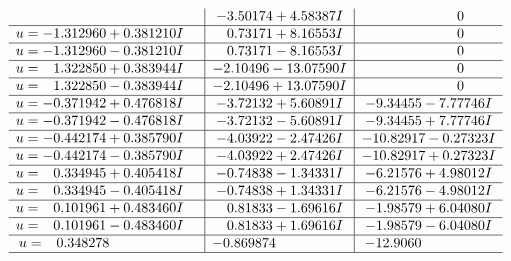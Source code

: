 \documentclass[1p]{elsarticle_modified}
\theoremstyle{definition}
\begin{document}
$$\begin{array}{c|c|c}
 & -3.50174 + 4.58387 I & \phantom{-0.000000 } 0 \\ \hline\begin{aligned}
u &= -1.312960 + 0.381210 I\end{aligned}
 & \phantom{-}0.73171 + 8.16553 I & \phantom{-0.000000 } 0 \\ \hline\begin{aligned}
u &= -1.312960 - 0.381210 I\end{aligned}
 & \phantom{-}0.73171 - 8.16553 I & \phantom{-0.000000 } 0 \\ \hline\begin{aligned}
u &= \phantom{-}1.322850 + 0.383944 I\end{aligned}
 & -2.10496 - 13.07590 I & \phantom{-0.000000 } 0 \\ \hline\begin{aligned}
u &= \phantom{-}1.322850 - 0.383944 I\end{aligned}
 & -2.10496 + 13.07590 I & \phantom{-0.000000 } 0 \\ \hline\begin{aligned}
u &= -0.371942 + 0.476818 I\end{aligned}
 & -3.72132 + 5.60891 I & -9.34455 - 7.77746 I \\ \hline\begin{aligned}
u &= -0.371942 - 0.476818 I\end{aligned}
 & -3.72132 - 5.60891 I & -9.34455 + 7.77746 I \\ \hline\begin{aligned}
u &= -0.442174 + 0.385790 I\end{aligned}
 & -4.03922 - 2.47426 I & -10.82917 - 0.27323 I \\ \hline\begin{aligned}
u &= -0.442174 - 0.385790 I\end{aligned}
 & -4.03922 + 2.47426 I & -10.82917 + 0.27323 I \\ \hline\begin{aligned}
u &= \phantom{-}0.334945 + 0.405418 I\end{aligned}
 & -0.74838 - 1.34331 I & -6.21576 + 4.98012 I \\ \hline\begin{aligned}
u &= \phantom{-}0.334945 - 0.405418 I\end{aligned}
 & -0.74838 + 1.34331 I & -6.21576 - 4.98012 I \\ \hline\begin{aligned}
u &= \phantom{-}0.101961 + 0.483460 I\end{aligned}
 & \phantom{-}0.81833 - 1.69616 I & -1.98579 + 6.04080 I \\ \hline\begin{aligned}
u &= \phantom{-}0.101961 - 0.483460 I\end{aligned}
 & \phantom{-}0.81833 + 1.69616 I & -1.98579 - 6.04080 I \\ \hline\begin{aligned}
u &= \phantom{-}0.348278\phantom{ +0.000000I}\end{aligned}
 & -0.869874\phantom{ +0.000000I} & -12.9060\phantom{ +0.000000I}\\
 \hline 
 \end{array}$$\newpage
\end{document}
